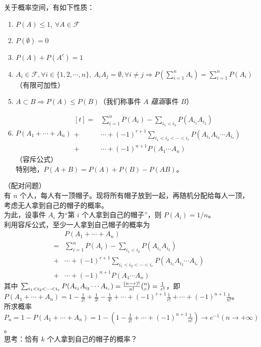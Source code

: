 \documentclass[../main.tex]{subfiles}
\begin{document}
\begin{proposition}
    关于概率空间，有如下性质：
    \begin{enumerate}
        \item $P(A)\leq 1,\ \forall A\in\mathcal{F}$
        \item $P(\emptyset)=0$
        \item $P(A)+P(A^c)=1$
        \item $A_i\in\mathcal{F},\forall i\in\{1,2,\cdots,n\},\ A_iA_j=\emptyset,\forall i\neq j\Rightarrow P(\sum_{i=1}^n A_i)=\sum_{i=1}^n P(A_i)$（有限可加性）
        \item $A\subset B\Rightarrow P(A)\leq P(B)$（我们称事件 $A$ \emph{蕴涵}事件 $B$）
        \item $P(A_1+\cdots+A_n)  \begin{aligned}[t]
                      = & \sum_{i=1}^n P(A_i)-\sum_{i_1<i_2}P(A_{i_1}A_{i_2})                       \\
                      + & \cdots+(-1)^{r+1}\sum_{i_1<i_2<\cdots<i_r}P(A_{i_1}A_{i_2}\cdots A_{i_r}) \\
                      + & \cdots+(-1)^{n+1}P(A_1\cdots A_n)
                  \end{aligned}$（容斥公式）\\
              特别地，$P(A+B)=P(A)+P(B)-P(AB)$。
    \end{enumerate}
\end{proposition}

\begin{example}
    （配对问题）\\
    有 $n$ 个人，每人有一顶帽子。现将所有帽子放到一起，再随机分配给每人一顶，考虑无人拿到自己的帽子的概率。\\
    为此，设事件 $A_i$ 为“第 $i$ 个人拿到自己的帽子”，则 $P(A_i)=1/n$。\\
    利用容斥公式，至少一人拿到自己帽子的概率为
    \begin{equation*}
        \begin{aligned}
              & P(A_1+\cdots+A_n)                                                         \\
            = & \sum_{i=1}^n P(A_i)-\sum_{i_1<i_2}P(A_{i_1}A_{i_2})                       \\
            + & \cdots+(-1)^{r+1}\sum_{i_1<i_2<\cdots<i_r}P(A_{i_1}A_{i_2}\cdots A_{i_r}) \\
            + & \cdots+(-1)^{n+1}P(A_1\cdots A_n)
        \end{aligned}
    \end{equation*}
    其中 $\sum_{i_1<i_2<\cdots<i_r}P(A_{i_1}A_{i_2}\cdots A_{i_r})=\frac{(n-r)!}{n!}\tbinom{n}{r}=\frac{1}{r!}$，即 $P(A_1+\cdots+A_n)=1-\frac{1}{2!}+\frac{1}{3!}-\frac{1}{4!}+\cdots+(-1)^{r+1}\frac{1}{r!}+\cdots+(-1)^{n+1}\frac{1}{n!}$。\\
    所求概率 $P_n=1-P(A_1+\cdots+A_n)=1-(1-\frac{1}{2!}+\cdots+(-1)^{n+1}\frac{1}{n!})\rightarrow e^{-1}(n\rightarrow+\infty)$。\\
    思考：恰有 $k$ 个人拿到自己的帽子的概率？
\end{example}
\end{document}
